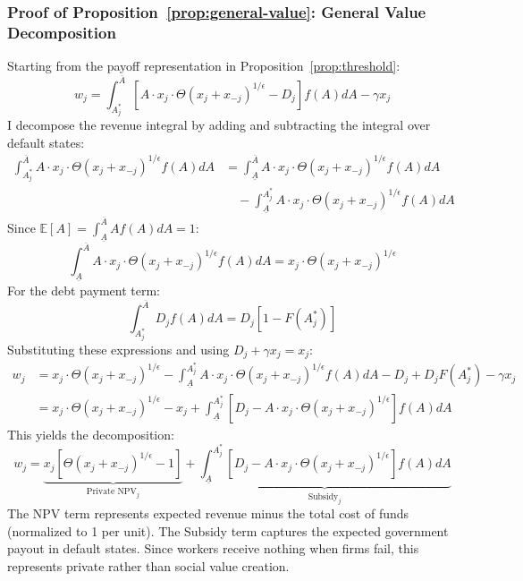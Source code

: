 \documentclass[12pt]{article}
\begin{document}
\subsubsection{Proof of Proposition~\ref{prop:general-value}: General Value Decomposition}
\label{app:proof-general-value}
Starting from the payoff representation in Proposition~\ref{prop:threshold}:
\begin{equation}
w_{j} = \int_{A_{j}^{*}}^{\overline{A}}[A \cdot x_{j} \cdot \Theta(x_{j}+x_{-j})^{1/\epsilon} - D_{j}]f(A)dA - \gamma x_{j}
\end{equation}
I decompose the revenue integral by adding and subtracting the integral over default states:
\begin{align}
\int_{A_{j}^{*}}^{\overline{A}} A \cdot x_{j} \cdot \Theta(x_{j}+x_{-j})^{1/\epsilon}f(A)dA &= \int_{\underline{A}}^{\overline{A}} A \cdot x_{j} \cdot \Theta(x_{j}+x_{-j})^{1/\epsilon}f(A)dA \nonumber \\
&\quad - \int_{\underline{A}}^{A_{j}^{*}} A \cdot x_{j} \cdot \Theta(x_{j}+x_{-j})^{1/\epsilon}f(A)dA
\end{align}
Since $\mathbb{E}[A] = \int_{\underline{A}}^{\overline{A}} Af(A)dA = 1$:
\begin{equation}
\int_{\underline{A}}^{\overline{A}} A \cdot x_{j} \cdot \Theta(x_{j}+x_{-j})^{1/\epsilon}f(A)dA = x_{j} \cdot \Theta(x_{j}+x_{-j})^{1/\epsilon}
\end{equation}
For the debt payment term:
\begin{equation}
\int_{A_{j}^{*}}^{\overline{A}} D_{j}f(A)dA = D_{j}[1-F(A_{j}^{*})]
\end{equation}
Substituting these expressions and using $D_{j} + \gamma x_{j} = x_{j}$:
\begin{align}
w_{j} &= x_{j} \cdot \Theta(x_{j}+x_{-j})^{1/\epsilon} - \int_{\underline{A}}^{A_{j}^{*}} A \cdot x_{j} \cdot \Theta(x_{j}+x_{-j})^{1/\epsilon}f(A)dA - D_{j} + D_{j}F(A_{j}^{*}) - \gamma x_{j} \\
&= x_{j} \cdot \Theta(x_{j}+x_{-j})^{1/\epsilon} - x_{j} + \int_{\underline{A}}^{A_{j}^{*}}[D_{j} - A \cdot x_{j} \cdot \Theta(x_{j}+x_{-j})^{1/\epsilon}]f(A)dA
\end{align}
This yields the decomposition:
\begin{equation}
w_{j} = \underbrace{x_{j}[\Theta(x_{j}+x_{-j})^{1/\epsilon}-1]}_{\text{Private NPV}_{j}} + \underbrace{\int_{\underline{A}}^{A_{j}^{*}}[D_{j}-A \cdot x_{j} \cdot \Theta(x_{j}+x_{-j})^{1/\epsilon}]f(A)dA}_{\text{Subsidy}_{j}}
\end{equation}
The NPV term represents expected revenue minus the total cost of funds (normalized to 1 per unit). The Subsidy term captures the expected government payout in default states. Since workers receive nothing when firms fail, this represents private rather than social value creation.
\end{document}
